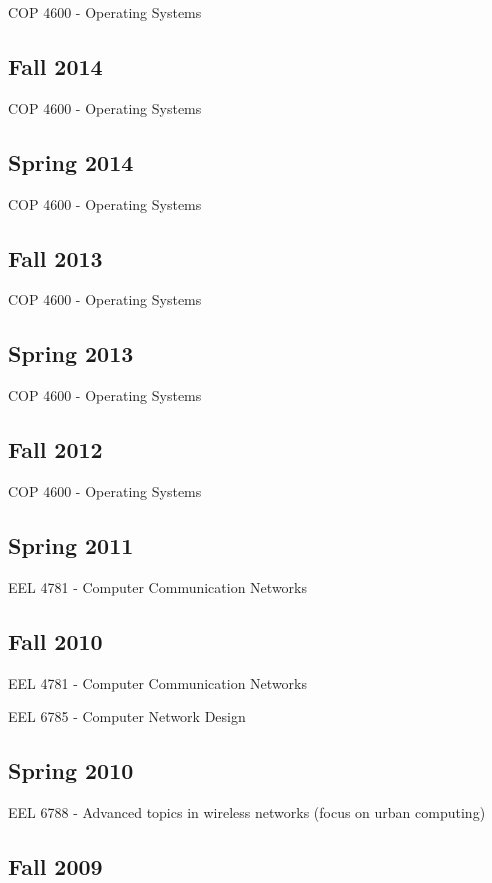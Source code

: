COP 4600 - Operating Systems

\subsection*{Fall 2014}

COP 4600 - Operating Systems

\subsection*{Spring 2014}

COP 4600 - Operating Systems

\subsection*{Fall 2013}

COP 4600 - Operating Systems

\subsection*{Spring 2013}

COP 4600 - Operating Systems

\subsection*{Fall 2012}

COP 4600 - Operating Systems

\subsection* {Spring 2011}

EEL 4781 - Computer Communication Networks

\subsection*{Fall 2010}

EEL 4781 - Computer Communication Networks

EEL 6785 - Computer Network Design

\subsection*{Spring 2010}

EEL 6788 - Advanced topics in wireless networks (focus on urban computing)

\subsection*{Fall 2009}

